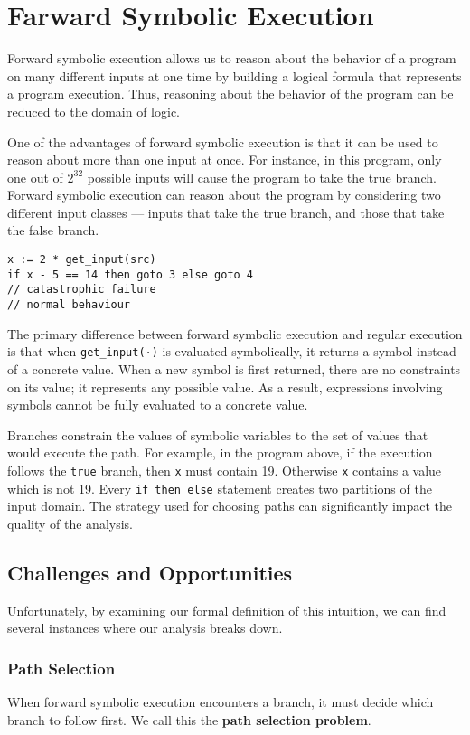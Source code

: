 \section{Farward Symbolic Execution} 
Forward symbolic execution allows us to reason about the behavior of a program on many different inputs at one time by building a logical formula that represents a program execution. Thus, reasoning about the behavior of the program can be reduced to the domain of logic.

One of the advantages of forward symbolic execution is that it can be used to reason about more than one input at once. For instance, in this program, only one out of $2^{32}$ possible inputs will cause the program to take the true branch. Forward symbolic execution can reason about the program by considering two different input classes — inputs that take the true branch, and those that take the false branch.

\begin{lstlisting}
x := 2 * get_input(src)
if x - 5 == 14 then goto 3 else goto 4
// catastrophic failure
// normal behaviour
\end{lstlisting}

The primary difference between forward symbolic execution and regular execution is that when \texttt{get\_input(·)} is evaluated symbolically, it returns a symbol instead of a concrete value. When a new symbol is first returned, there are no constraints on its value; it represents any possible value. As a result, expressions involving symbols cannot be fully evaluated to a concrete value.

Branches constrain the values of symbolic variables to the set of values that would execute the path. For example, in the program above, if the execution follows the \texttt{true} branch, then \texttt{x} must contain 19. Otherwise \texttt{x} contains a value which is not 19. Every \texttt{if then else} statement creates two partitions of the input domain. The strategy used for choosing paths can significantly impact the quality of the analysis.

\subsection{Challenges and Opportunities}
Unfortunately, by examining our formal definition of this intuition, we can find several instances where our analysis breaks down.

\subsubsection{Path Selection} 
When forward symbolic execution encounters a branch, it must decide which branch to follow first. We call this the \textbf{path selection problem}.

